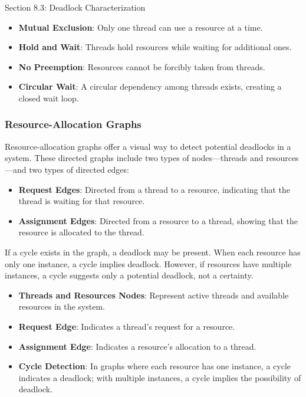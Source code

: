 \begin{notes}{Section 8.3: Deadlock Characterization}
    \begin{highlight}
    
        \begin{itemize}
            \item \textbf{Mutual Exclusion}: Only one thread can use a resource at a time.
            \item \textbf{Hold and Wait}: Threads hold resources while waiting for additional ones.
            \item \textbf{No Preemption}: Resources cannot be forcibly taken from threads.
            \item \textbf{Circular Wait}: A circular dependency among threads exists, creating a closed wait loop.
        \end{itemize}
    
    \end{highlight}
    
    \subsubsection*{Resource-Allocation Graphs}
    
    Resource-allocation graphs offer a visual way to detect potential deadlocks in a system. These directed graphs include two types of nodes—threads and resources—and two types of directed edges:

    \begin{itemize}
        \item \textbf{Request Edges}: Directed from a thread to a resource, indicating that the thread is waiting for that resource.
        \item \textbf{Assignment Edges}: Directed from a resource to a thread, showing that the resource is allocated to the thread.
    \end{itemize}
    
    If a cycle exists in the graph, a deadlock may be present. When each resource has only one instance, a cycle implies deadlock. However, if resources have multiple instances, a cycle suggests only a potential deadlock, not a certainty.
    
    \begin{highlight}
    
        \begin{itemize}
            \item \textbf{Threads and Resources Nodes}: Represent active threads and available resources in the system.
            \item \textbf{Request Edge}: Indicates a thread's request for a resource.
            \item \textbf{Assignment Edge}: Indicates a resource's allocation to a thread.
            \item \textbf{Cycle Detection}: In graphs where each resource has one instance, a cycle indicates a deadlock; with multiple instances, a cycle implies the possibility of deadlock.
        \end{itemize}
    

\end{highlight}
\end{notes}
